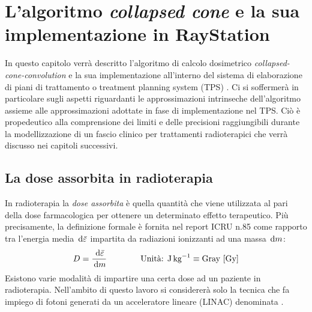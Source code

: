 \chapter{L'algoritmo \emph{collapsed cone} e la sua implementazione in RayStation}
\setcounter{minitocdepth}{1}
\minitoc
\setcounter{minitocdepth}{2}
\textsf{In questo capitolo verrà descritto l'algoritmo di calcolo dosimetrico \textit{collapsed-cone-convolution} e la sua implementazione all'interno del sistema di elaborazione di piani di trattamento o treatment planning system (TPS) \RS. Ci si soffermerà in particolare sugli aspetti riguardanti le approssimazioni intrinseche dell'algoritmo assieme alle approssimazioni adottate in fase di implementazione nel TPS. Ciò è propedeutico alla comprensione dei limiti e delle precisioni raggiungibili durante la modellizzazione di un fascio clinico per trattamenti radioterapici che verrà discusso nei capitoli successivi.}

\section{La dose assorbita in radioterapia}
\label{sec:intro}
In radioterapia la \textit{dose assorbita} è quella quantità che viene utilizzata al pari della dose farmacologica per ottenere un determinato effetto terapeutico. Più precisamente, la definizione formale è fornita nel report ICRU n.85 \cite{ICRU85} come rapporto tra l'energia media $\,\text{d} \bar{\varepsilon}$ impartita da radiazioni ionizzanti ad una massa $\,\text{d} m$:
\begin{equation}
D = \frac{\,\text{d} \bar{\varepsilon}}{\,\text{d} m} \qquad\qquad \text{Unità: J\,kg}^{-1} \equiv \text{Gray [Gy]}
\end{equation} 
Esistono varie modalità di impartire una certa dose ad un paziente in radioterapia. Nell'ambito di questo lavoro si considererà solo la tecnica che fa impiego di fotoni generati da un acceleratore lineare (LINAC) denominata .

